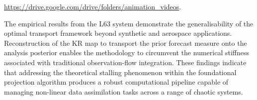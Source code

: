 \begin{center}
    \href{https://drive.google.com/drive/folders/1FEkJWo6-cSvWa-dAoq2DXf_d0Pf9xZye?usp=sharing}{https://drive.google.com/drive/folders/animation\_videos}.
\end{center}

The empirical results from the L63 system demonstrate the generalisability of the optimal transport framework beyond synthetic and aerospace applications. Reconstruction of the KR map to transport the prior forecast measure onto the analysis posterior enables the methodology to circumvent the numerical stiffness associated with traditional observation-flow integration. These findings indicate that addressing the theoretical stalling phenomenon within the foundational projection algorithm produces a robust computational pipeline capable of managing non-linear data assimilation tasks across a range of chaotic systems.